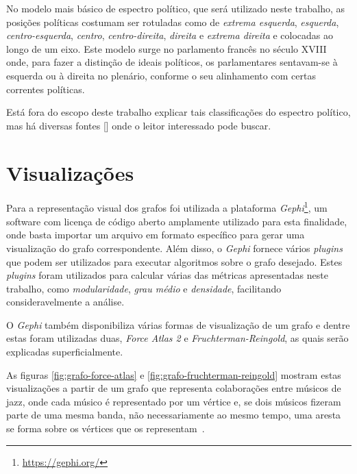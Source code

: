 No modelo mais básico de espectro político, que será utilizado neste trabalho, as posições políticas costumam ser rotuladas como de \emph{extrema esquerda}, \emph{esquerda}, \emph{centro-esquerda}, \emph{centro}, \emph{centro-direita}, \emph{direita} e \emph{extrema direita} e colocadas ao longo de um eixo. Este modelo surge no parlamento francês no século XVIII onde, para fazer a distinção de ideais políticos, os parlamentares sentavam-se à esquerda ou à direita no plenário, conforme o seu alinhamento com certas correntes políticas.


Está fora do escopo deste trabalho explicar tais classificações do espectro político, mas há diversas fontes [] onde o leitor interessado pode buscar.


\section{Visualizações}
\label{conceitos__visualizacoes}

Para a representação visual dos grafos foi utilizada a plataforma \emph{Gephi}\footnote{\url{https://gephi.org/}}, um software com licença de código aberto amplamente utilizado para esta finalidade, onde basta importar um arquivo em formato específico para gerar uma visualização do grafo correspondente. Além disso, o \emph{Gephi} fornece vários \emph{plugins} que podem ser utilizados para executar algoritmos sobre o grafo desejado. Estes \emph{plugins} foram utilizados para calcular várias das métricas apresentadas neste trabalho, como \emph{modularidade}, \emph{grau médio} e \emph{densidade}, facilitando consideravelmente a análise.

O \emph{Gephi} também disponibiliza várias formas de visualização de um grafo e dentre estas foram utilizadas duas, \emph{Force Atlas 2} e \emph{Fruchterman-Reingold}, as quais serão explicadas superficialmente.

As figuras \ref{fig:grafo-force-atlas} e \ref{fig:grafo-fruchterman-reingold} mostram estas visualizações a partir de um grafo que representa colaborações entre músicos de jazz, onde cada músico é representado por um vértice e, se dois músicos fizeram parte de uma mesma banda, não necessariamente ao mesmo tempo, uma aresta se forma sobre os vértices que os representam~\cite{gleiser2003list}.

